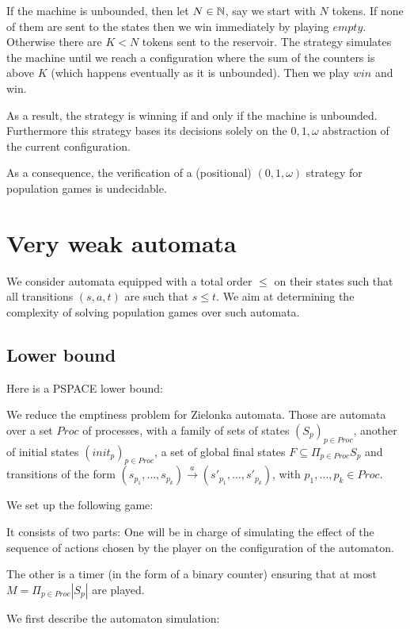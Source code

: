 \documentclass{article}
\begin{document}
If the machine is unbounded, then let $N \in \mathbb{N}$, say we start with $N$ tokens.
If none of them are sent to the states then we win immediately by playing $empty$.
Otherwise there are $K < N$ tokens sent to the reservoir. The strategy simulates the machine until we reach a configuration where the sum of the counters is above $K$ (which happens eventually as it is unbounded). Then we play $win$ and win.

As a result, the strategy is winning if and only if the machine is unbounded.
Furthermore this strategy bases its decisions solely on the $0, 1, \omega$ abstraction of the current configuration.

As a consequence, the verification of a (positional) $(0, 1, \omega)$ strategy for population games is undecidable.

\section{Very weak automata}

We consider automata equipped with a total order $\leq$ on their states such that all transitions $(s, a, t)$ are such that $s \leq t$. We aim at determining the complexity of solving population games over such automata.

\subsection{Lower bound}

Here is a PSPACE lower bound: 

We reduce the emptiness problem for Zielonka automata. Those are automata over a set $Proc$ of processes, with a family of sets of states $(S_p)_{p \in Proc}$, another of initial states $(init_p)_{p \in Proc}$, a set of global final states $F \subseteq \Pi_{p\in Proc} S_p$ and transitions of the form $(s_{p_1}, \ldots, s_{p_k}) \xrightarrow{a} (s'_{p_1}, \ldots, s'_{p_k})$, with $p_1, \ldots, p_k \in Proc$.

We set up the following game: 

It consists of two parts: One will be in charge of simulating the effect of the sequence of actions chosen by the player on the configuration of the automaton.

The other is a timer (in the form of a binary counter) ensuring that at most  $M = \Pi_{p\in Proc} |S_p|$ are played.

We first describe the automaton simulation: 
\end{document}
